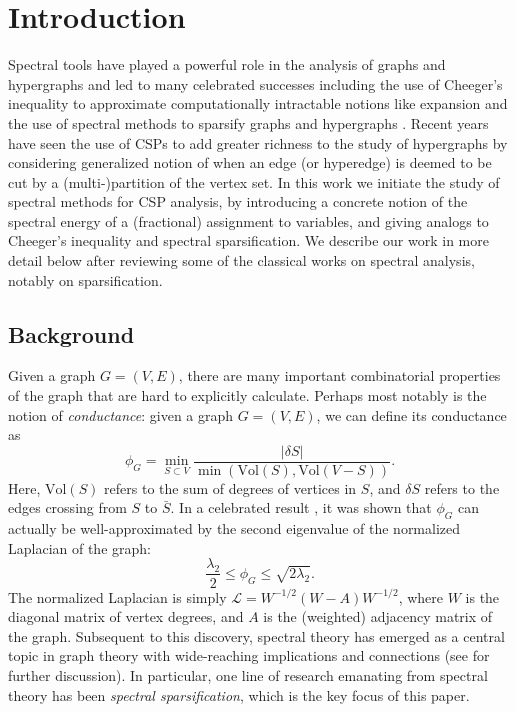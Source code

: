 \documentclass[11pt]{article}
\theoremstyle{definition}
\begin{document}
\pagebreak

\tableofcontents


\pagebreak


\section{Introduction}

Spectral tools have played a powerful role in the analysis of graphs and hypergraphs and led to many celebrated successes including the use of Cheeger's inequality to approximate computationally intractable notions like expansion \cite{AM85, Alo86} and the use of spectral methods to sparsify graphs and hypergraphs \cite{BSS09, SY19}. Recent years have seen the use of CSPs to add greater richness to the study of hypergraphs by considering generalized notion of when an edge (or hyperedge) is deemed to be cut by a (multi-)partition of the vertex set. In this work we initiate the study of spectral methods for CSP analysis, by introducing a concrete notion of the spectral energy of a (fractional) assignment to variables, and giving analogs to Cheeger's inequality and spectral sparsification. We describe our work in more detail below after reviewing some of the classical works on spectral analysis, notably on sparsification.

\subsection{Background}

Given a graph $G = (V, E)$, there are many important combinatorial properties of the graph that are hard to explicitly calculate. Perhaps most notably is the notion of \emph{conductance}: given a graph $G = (V, E)$, we can define its conductance as 
\[
\phi_G = \min_{S \subset V} \frac{|\delta S|}{\min(\mathrm{Vol}(S),\mathrm{Vol}(V - S))}.
\]
Here, $\mathrm{Vol}(S)$ refers to the sum of degrees of vertices in $S$, and $\delta S$ refers to the edges crossing from $S$ to $\bar{S}$. In a celebrated result \cite{AM85, Alo86}, it was shown that $\phi_G$ can actually be well-approximated by the second eigenvalue of the normalized Laplacian of the graph: 
\[
\frac{\lambda_2}{2} \leq \phi_G \leq \sqrt{2 \lambda _2}.
\]
The normalized Laplacian is simply $\mathcal{L} = W^{-1/2} (W-A)W^{-1/2}$, where $W$ is the diagonal matrix of vertex degrees, and $A$ is the (weighted) adjacency matrix of the graph. Subsequent to this discovery, spectral theory has emerged as a central topic in graph theory with wide-reaching implications and connections (see \cite{Spi07} for further discussion). In particular, one line of research emanating from spectral theory has been \emph{spectral sparsification}, which is the key focus of this paper.
\end{document}
